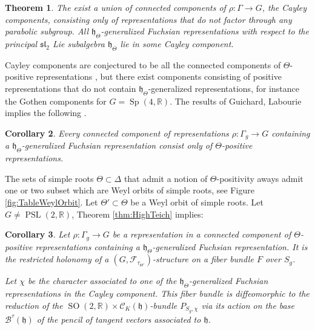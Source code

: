 \documentclass[reqno,10pt]{amsart}
\theoremstyle{plain}
\newtheorem{thm}{Theorem}[section]
\newtheorem{cor}[thm]{Corollary}
\theoremstyle{definition}
\theoremstyle{remark}
\newcommand{\type}{\tau}
\newcommand{\R}{\mathbb{R}}
\DeclareMathOperator{\PSL}{PSL}
\DeclareMathOperator{\SO}{SO}
\DeclareMathOperator{\Sp}{Sp}
\begin{document}
\begin{thm}{\cite[Theorem 8.8]{magical}}
The exist a union of connected components of $\rho:\Gamma\to G$, the \emph{Cayley components}, consisting only of representations that do not factor through any parabolic subgroup. All $\mathfrak{h}_\Theta$-generalized Fuchsian representations with respect to the principal $\mathfrak{sl}_2$ Lie subalgebra $\mathfrak{h}_\Theta$ lie in some Cayley component.
\end{thm}

Cayley components are conjectured to be all the connected components of $\Theta$-positive representations \cite{magical}, but there exist components consisting of positive representations that do not contain $\mathfrak{h}_\Theta$-generalized representations, for instance the Gothen components for $G=\Sp(4,\R)$. The results of Guichard, Labourie implies the following \cite{positivityLabourie}. 

\begin{cor}
Every connected component of representations $\rho:\Gamma_g\to G$ containing a $\mathfrak{h}_\Theta$-generalized Fuchsian representation consist only of $\Theta$-positive representations. 
\end{cor}


The sets of simple roots $\Theta\subset \Delta$ that admit a notion of $\Theta$-positivity aways admit one or two subset which are Weyl orbits of simple roots, see Figure \ref{fig:TableWeylOrbit}. Let $\Theta'\subset \Theta$ be a Weyl orbit of simple roots. Let $G\neq \PSL(2, \R)$, Theorem \ref{thm:HighTeich} implies:

\begin{cor}
\label{cor:ThetaStruct}
Let $\rho:\Gamma_g\to G$ be a representation in a connected component of $\Theta$-positive representations containing a $\mathfrak{h}_\Theta$-generalized Fuchsian representation. It is the restricted holonomy of a $(G, \mathcal{F}_{\type_{\Theta'}})$-structure on a fiber bundle $F$ over $S_g$. 

\medskip

Let $\chi$ be the character associated to one of the $\mathfrak{h}_\Theta$-generalized Fuchsian representations in the Cayley component. This fiber bundle is diffeomorphic to the reduction of the $\SO(2,\R)\times \mathcal{C}_K(\mathfrak{h})$-bundle $P_{S_g,\chi}$ via its action on the base $\mathcal{B}^\type(\mathfrak{h})$ of the pencil of tangent vectors associated to $\mathfrak{h}$.
\end{cor}
\end{document}
